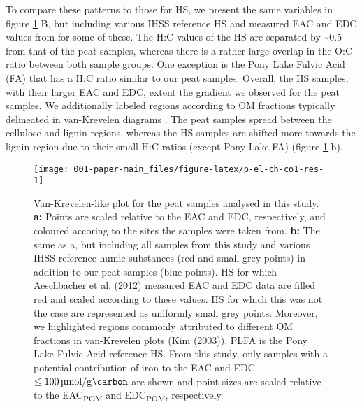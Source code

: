 \documentclass[draft,linenumbers]{agujournal2018}
\begin{document}
To compare these patterns to those for HS, we present the same variables
in figure \ref{fig:p-el-ch-co1-res} B, but including various IHSS
reference HS and measured EAC and EDC values from
\citet{Aeschbacher.2012} for some of these. The H:C values of the HS are
separated by \textasciitilde0.5 from that of the peat samples, whereas
there is a rather large overlap in the O:C ratio between both sample
groups. One exception is the Pony Lake Fulvic Acid (FA) that has a H:C
ratio similar to our peat samples. Overall, the HS samples, with their
larger EAC and EDC, extent the gradient we observed for the peat
samples. We additionally labeled regions according to OM fractions
typically delineated in van-Krevelen diagrams \citep{Kim.2003}. The peat
samples spread between the cellulose and lignin regions, whereas the HS
samples are shifted more towards the lignin region due to their small
H:C ratios (except Pony Lake FA) (figure \ref{fig:p-el-ch-co1-res} b).

\begin{figure}[H]

{\centering \texttt{[image: 001-paper-main\_files/figure-latex/p-el-ch-co1-res-1]} 

}

\caption{Van-Krevelen-like plot for the peat samples analysed in this study. \textbf{a:} Points are scaled relative to the EAC and EDC, respectively, and coloured accoring to the sites the samples were taken from. \textbf{b:} The same as a, but including all samples from this study and various IHSS reference humic substances (red and small grey points) in addition to our peat samples (blue points). HS for which Aeschbacher et al. (2012) measured EAC and EDC data are filled red and scaled according to these values. HS for which this was not the case are represented as uniformly small grey points. Moreover, we highlighted regions commonly attributed to different OM fractions in van-Krevelen plots (Kim (2003)). PLFA is the Pony Lake Fulvic Acid reference HS. From this study, only samples with a potential contribution of iron to the EAC and EDC $\le\SI{100}{\micro\mol\per\gram\carbon}$ are shown and point sizes are scaled relative to the EAC\textsubscript{POM} and EDC\textsubscript{POM}, respectively.}\label{fig:p-el-ch-co1-res}
\end{figure}
\end{document}
